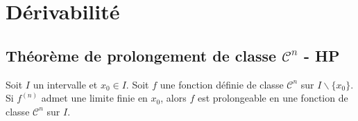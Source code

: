 \documentclass[../main.tex]{subfiles}
\begin{document}
\setcounter{chapter}{17}
\chapter{Dérivabilité}
\tableofcontents
\clearpage

\section{Théorème de prolongement de classe $\mathcal{C}^n$ - HP}
\begin{tcolorbox}[title=Théorème 18.43 - HP, title filled=false, colframe=orange, colback=orange!10!white]
    Soit $I$ un intervalle et $x_0 \in I$. Soit $f$ une fonction définie de classe $\mathcal{C}^n$ sur $I\backslash \{x_0\}$. Si $f^{(n)}$ admet une limite finie en $x_0$, alors $f$ est prolongeable en une fonction de classe $\mathcal{C}^n$ sur $I$.
\end{tcolorbox}
\end{document}
